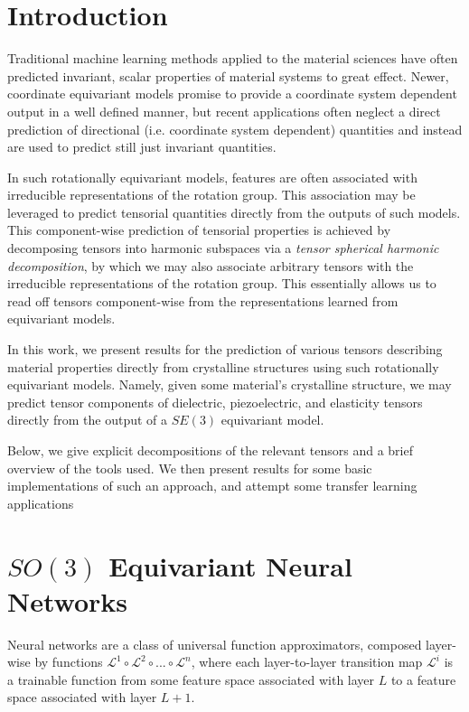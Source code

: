 \documentclass[10pt,a4paper]{article}
\begin{document}
\section{Introduction}
Traditional  machine learning methods applied to the material sciences have often predicted invariant, scalar properties of material systems to great effect. Newer, coordinate equivariant models promise to provide a coordinate system dependent output in a well defined manner, but recent applications often neglect a direct prediction of directional (i.e. coordinate system dependent) quantities and instead are used to predict still just invariant quantities.

In such rotationally equivariant models, features are often associated with irreducible representations of the rotation group. This association may be leveraged to predict tensorial quantities directly from the outputs of such models.
This component-wise prediction of tensorial properties is achieved by decomposing tensors into harmonic subspaces via a \textit{tensor spherical harmonic decomposition}, by which we may also associate arbitrary tensors with the irreducible representations of the rotation group. This essentially allows us to read off tensors component-wise from the representations learned from equivariant models.

In this work, we present results for the prediction of various tensors describing material properties directly from crystalline structures using such rotationally equivariant models. Namely, given some material's crystalline structure, we may predict tensor components of dielectric, piezoelectric, and elasticity tensors directly from the output of a $SE(3)$ equivariant model.

Below, we give explicit decompositions of the relevant tensors and a brief overview of the tools used. We then present results for some basic implementations of such an approach, and attempt some transfer learning applications

\section{$SO(3)$ Equivariant Neural Networks}
Neural networks are a class of universal function approximators, composed layer-wise by functions $\mathcal{L}^1\circ\mathcal{L}^2\circ ... \circ \mathcal{L}^n $, where each layer-to-layer transition map $\mathcal{L}^i$ is a trainable function from some feature space associated with layer $L$ to a feature space associated with layer $L+1$.
\end{document}
